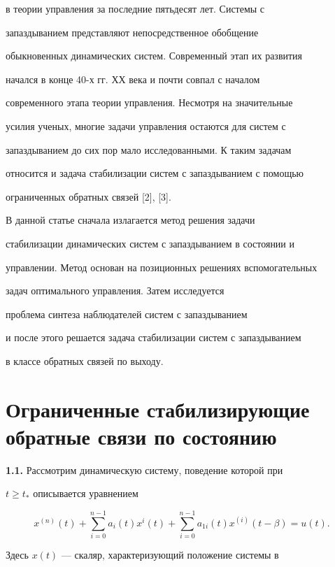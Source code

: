 в теории управления за последние пятьдесят лет. Системы с


запаздыванием представляют непосредственное обобщение


обыкновенных динамических систем. Современный этап их развития


начался в конце 40-х гг. ХХ века и почти совпал с началом


современного этапа теории управления. Несмотря на значительные


усилия ученых, многие задачи управления остаются для систем с


запаздыванием до сих пор мало исследованными. К таким задачам


относится и задача стабилизации систем с запаздыванием с помощью


ограниченных обратных связей [2], [3].


В данной статье сначала излагается метод решения задачи


стабилизации динамических систем с запаздыванием в состоянии и


управлении. Метод основан на позиционных решениях вспомогательных 


задач оптимального управления. Затем исследуется


проблема синтеза наблюдателей систем с запаздыванием


и после этого решается задача стабилизации систем с запаздыванием


в классе обратных связей по выходу.





\section{Ограниченные стабилизирующие обратные связи по состоянию}





{\bf 1.1.} Рассмотрим динамическую систему, поведение которой при


$t \ge t_*$ описывается уравнением


\begin{equation}\label{11}


x^{(n)}(t)+\sum_{i=0}^{n-1}a_i(t)x^{i}(t)+


\sum_{i=0}^{n-1}a_{1i}(t)x^{(i)}(t-\beta)=u(t).


\end{equation}


Здесь $x(t)$ --- скаляр, характеризующий положение системы в


